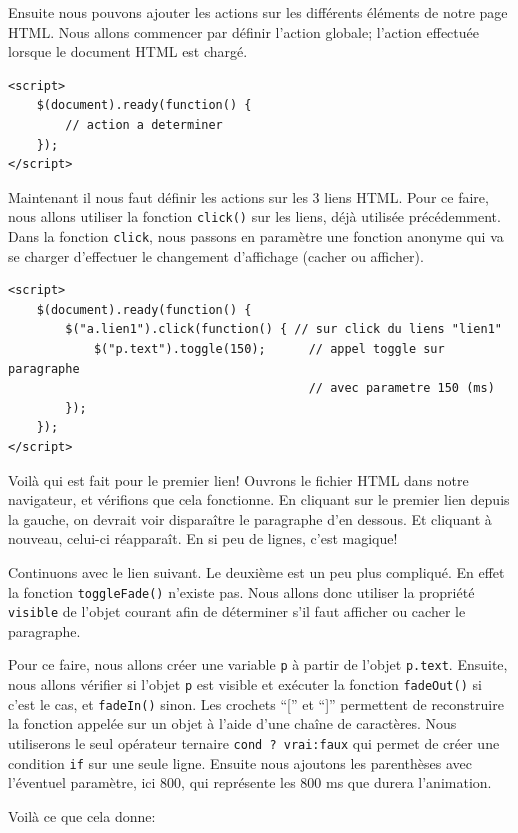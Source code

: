 \documentclass[10pt,a4paper,titlepage]{article}
\begin{document}
Ensuite nous pouvons ajouter les actions sur les différents éléments de notre page HTML. Nous allons commencer par définir l'action globale; l'action effectuée lorsque le document HTML est chargé. 

\begin{lstlisting}
<script>
	$(document).ready(function() {		
		// action a determiner
	});
</script>
\end{lstlisting}

Maintenant il nous faut définir les actions sur les 3 liens HTML. Pour ce faire, nous allons utiliser la fonction \texttt{click()} sur les liens, déjà utilisée précédemment. Dans la fonction \texttt{click}, nous passons en paramètre une fonction anonyme qui va se charger d'effectuer le changement d'affichage (cacher ou afficher).

\begin{lstlisting}
<script>
	$(document).ready(function() {    
		$("a.lien1").click(function() { // sur click du liens "lien1"
			$("p.text").toggle(150);      // appel toggle sur paragraphe
			                              // avec parametre 150 (ms)        
		});
	});
</script>
\end{lstlisting}

Voilà qui est fait pour le premier lien! Ouvrons le fichier HTML dans notre navigateur, et vérifions que cela fonctionne. En cliquant sur le premier lien depuis la gauche, on devrait voir disparaître le paragraphe d'en dessous. Et cliquant à nouveau, celui-ci réapparaît. En si peu de lignes, c'est magique!

Continuons avec le lien suivant. Le deuxième est un peu plus compliqué. En effet la fonction \texttt{toggleFade()} n'existe pas. Nous allons donc utiliser la propriété \texttt{visible} de l'objet courant afin de déterminer s'il faut afficher ou cacher le paragraphe. 

Pour  ce faire, nous allons créer une variable \texttt{p} à partir de l'objet \texttt{p.text}. Ensuite, nous allons vérifier si l'objet \texttt{p} est visible et exécuter la fonction \texttt{fadeOut()} si c'est le cas, et \texttt{fadeIn()} sinon. Les crochets “[” et “]” permettent de reconstruire la fonction appelée sur un objet à l'aide d'une chaîne de caractères. Nous utiliserons le seul opérateur ternaire \texttt{cond ? vrai:faux} qui permet de créer une condition \texttt{if} sur une seule ligne. Ensuite nous ajoutons les parenthèses avec l'éventuel paramètre, ici 800, qui représente les 800 ms que durera l'animation.

Voilà ce que cela donne: 
\end{document}
